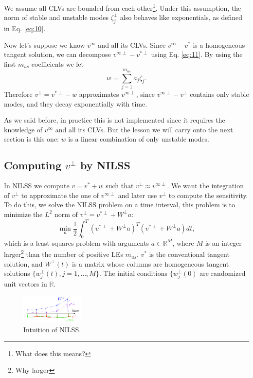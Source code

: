 \documentclass[10pt,twoside,a4paper]{article} %
\begin{document}
We assume all CLVs are bounded from each other\footnote{What does this means?}. Under this assumption, the norm of stable and unstable modes ${\zeta_j^\perp}$ also behaves like exponentials, as defined in Eq. \ref{eq:10}.

Now let's suppose we know $v^\infty$ and all its CLVs. Since $v^\infty - v^*$ is a homogeneous tangent solution, we can decompose $v^{\infty \perp} - v^{*\perp}$ using Eq. \ref{eq:11}. By using the first $m_{us}$ coefficients we let
\begin{equation}
  w= \sum_{j=1}^{m_{us}} a_j \zeta_j.
  \label{eq:12}
\end{equation}
Therefore $v^\perp = v^{*\perp} - w$ approximates $v^{\infty\perp}$, since $v^{\infty\perp} - v^\perp$ contains only stable modes, and they decay exponentially with time.

As we said before, in practice this is not implemented since it requires the knowledge of $v^\infty$ and all its CLVs. But the lesson we will carry onto the next section is this one: $w$ is a linear combination of only unstable modes.
\subsection{Computing $v^\perp$ by NILSS}\label{3.3}
In NILSS we compute $v = v^* + w$ such that $v^{\perp} \approx v^{\infty \perp}$. We want the integration of $v^{\perp}$ to approximate the one of $v^{\infty \perp}$ and later use $v^{\perp}$ to compute the sensitivity. To do this, we solve the NILSS problem on a time interval, this problem is to minimize the $L^2$ norm of $v^\perp = v^{*\perp} + W^\perp a$:
\begin{equation}
  \min_a \frac{1}{2} \int_0^T (v^{*\perp} + W^\perp a)^T (v^{*\perp} + W^\perp a) dt,
  \label{eq:13}
\end{equation}
which is a least squares problem with arguments $a\in \mathbb{R}^M$, where $M$ is an integer larger\footnote{Why larger} than the number of positive LEs $m_{us}$. $v^*$ is the conventional tangent solution, and $W^\perp (t)$ is a matrix whose columns are homogeneous tangent solutions $\{w_j^\perp(t), j=1,\ldots,M\}$. The initial conditions $\{w_j^\perp(0) $ are randomized unit vectors in $\mathbb{R}$.

\begin{figure} %
  \begin{center}
    \includegraphics[width=0.28\textwidth]{diff.png}
  \end{center}
  \caption{Intuition of NILSS.}
  \label{fig:2}
\end{figure}
\end{document}
